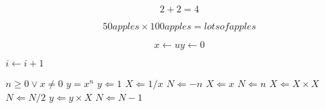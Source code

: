 \documentclass{article}
\begin{document}
{\Large

\begin{equation}
 2 + 2 = 4
\end{equation}

\begin{equation}
  50 apples \times 100 apples = lots of apples 
\end{equation}


\begin{equation}
  x \longleftarrow u
  y \longleftarrow 0
\end{equation}

\begin{algorithmic}

    \STATE $i \gets i + 1$
  \ENDFOR 
\end{algorithmic}

\begin{algorithmic}                    %
\REQUIRE $n \geq 0 \vee x \neq 0$
\ENSURE $y = x^n$
\STATE $y \Leftarrow 1$
\STATE $X \Leftarrow 1 / x$
\STATE $N \Leftarrow -n$
\ELSE
\STATE $X \Leftarrow x$
\STATE $N \Leftarrow n$
\ENDIF
{}
\STATE $X \Leftarrow X \times X$
\STATE $N \Leftarrow N / 2$
\ELSE[$N$ is odd]
\STATE $y \Leftarrow y \times X$
\STATE $N \Leftarrow N - 1$
\ENDIF
\ENDWHILE
\end{algorithmic}

}
\end{document}
